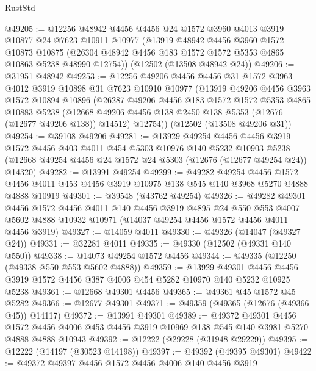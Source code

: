 \begin{lexlean}{RustStd}
\begin{coremodule}
@49205 := @12256
    @48942
    @4456
    @4456
    @24
    @1572
    @3960
    @4013
    @3919
    @10877
    @24
    @7623
    @10911
    @10977
    (@13919
      @48942
      @4456
      @3960
      @1572
      @10873
      @10875
      (@26304 @48942 @4456 @183 @1572 @1572 @5353 @4865 @10863 @5238 @48990 @12754))
    (@12502 (@13508 @48942 @24))
@49206 := @31951 @48942
@49253 := @12256
    @49206
    @4456
    @4456
    @31
    @1572
    @3963
    @4012
    @3919
    @10898
    @31
    @7623
    @10910
    @10977
    (@13919
      @49206
      @4456
      @3963
      @1572
      @10894
      @10896
      (@26287
        @49206
        @4456
        @183
        @1572
        @1572
        @5353
        @4865
        @10883
        @5238
        (@12668 @49206 @4456 @138 @2450 @138 @5353 (@12676 (@12677 @49206 @138)) @14512)
        @12754))
    (@12502 (@13508 @49206 @31))
@49254 := @39108 @49206
@49281 := @13929
    @49254
    @4456
    @4456
    @3919
    @1572
    @4456
    @403
    @4011
    @454
    @5303
    @10976
    @140
    @5232
    @10903
    @5238
    (@12668 @49254 @4456 @24 @1572 @24 @5303 (@12676 (@12677 @49254 @24)) @14320)
@49282 := @13991 @49254
@49299 := @49282
    @49254
    @4456
    @1572
    @4456
    @4011
    @453
    @4456
    @3919
    @10975
    @138
    @545
    @140
    @3968
    @5270
    @4888
    @4888
    @10919
@49301 := @39548 (@43762 @49254)
@49326 := @49282
    @49301
    @4456
    @1572
    @4456
    @4011
    @140
    @4456
    @3919
    @4895
    @24
    @550
    @553
    @4007
    @5602
    @4888
    @10932
    @10971
    (@14037 @49254 @4456 @1572 @4456 @4011 @4456 @3919)
@49327 := @14059 @4011
@49330 := @49326 (@14047 (@49327 @24))
@49331 := @32281 @4011
@49335 := @49330 (@12502 (@49331 @140 @550))
@49338 := @14073 @49254 @1572 @4456
@49344 := @49335 (@12250 (@49338 @550 @553 @5602 @4888))
@49359 := @13929
    @49301
    @4456
    @4456
    @3919
    @1572
    @4456
    @387
    @4006
    @454
    @5282
    @10970
    @140
    @5232
    @10925
    @5238
@49361 := @12668 @49301 @4456
@49365 := @49361 @45 @1572 @45 @5282
@49366 := @12677 @49301
@49371 := @49359 (@49365 (@12676 (@49366 @45)) @14117)
@49372 := @13991 @49301
@49389 := @49372
    @49301
    @4456
    @1572
    @4456
    @4006
    @453
    @4456
    @3919
    @10969
    @138
    @545
    @140
    @3981
    @5270
    @4888
    @4888
    @10943
@49392 := @12222 (@29228 (@31948 @29229))
@49395 := @12222 (@14197 (@30523 @14198))
@49397 := @49392 (@49395 @49301)
@49422 := @49372
    @49397
    @4456
    @1572
    @4456
    @4006
    @140
    @4456
    @3919

\end{coremodule}
\end{lexlean}
